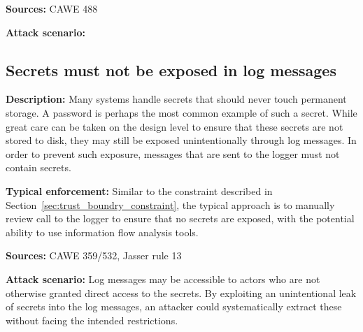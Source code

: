  \textbf{Sources:} CAWE 488
 
 \textbf{Attack scenario:}

\subsection{Secrets must not be exposed in log messages} 

\textbf{Description:} Many systems handle secrets that should never touch permanent storage. A password is perhaps the most common example of such a secret. While great care can be taken on the design level to ensure that these secrets are not stored to disk, they may still be exposed unintentionally through log messages. In order to prevent such exposure, messages that are sent to the logger must not contain secrets.

 \textbf{Typical enforcement:} Similar to the constraint described in Section~\ref{sec:trust_boundry_constraint}, the typical approach is to manually review call to the logger to ensure that no secrets are exposed, with the potential ability to use information flow analysis tools.
 
 \textbf{Sources:} CAWE 359/532, Jasser rule 13
 
 \textbf{Attack scenario:} Log messages may be accessible to actors who are not otherwise granted direct access to the secrets. By exploiting an unintentional leak of secrets into the log messages, an attacker could systematically extract these without facing the intended restrictions.